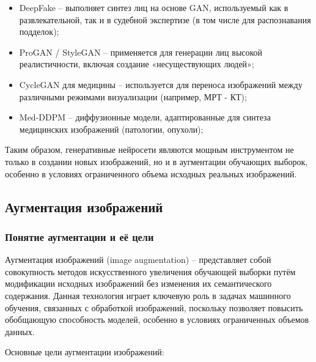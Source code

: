\begin{itemize}
	\item DeepFake – выполняет синтез лиц на основе GAN, используемый как в развлекательной, так и в судебной экспертизе (в том числе для распознавания подделок);
	\item ProGAN / StyleGAN – применяется для генерации лиц высокой реалистичности, включая создание «несуществующих людей»;
	\item CycleGAN для медицины – используется для переноса изображений между различными режимами визуализации (например, МРТ - КТ);
	\item Med-DDPM – диффузионные модели, адаптированные для синтеза медицинских изображений (патологии, опухоли);
\end{itemize}

Таким образом, генеративные нейросети являются мощным инструментом не только в создании новых изображений, но и в аугментации обучающих выборок, особенно в условиях ограниченного объема исходных реальных изображений.

\subsection{Аугментация изображений}
\subsubsection{Понятие аугментации и её цели}

Аугментация изображений (image augmentation) – представляет собой совокупность методов искусственного увеличения обучающей выборки путём модификации исходных изображений без изменения их семантического содержания. Данная технология играет ключевую роль в задачах машинного обучения, связанных с обработкой изображений, поскольку позволяет повысить обобщающую способность моделей, особенно в условиях ограниченных объемов данных.

Основные цели аугментации изображений:

